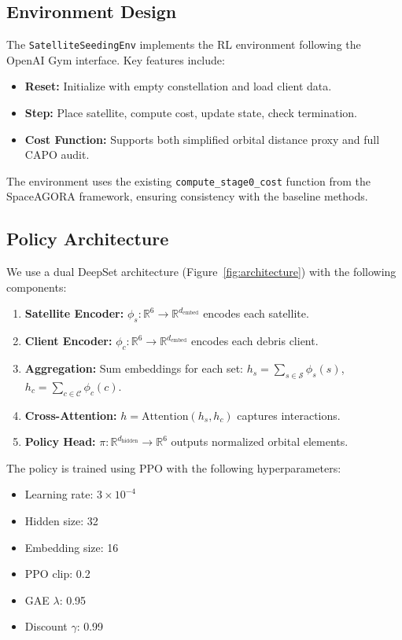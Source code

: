\subsection{Environment Design}

The \texttt{SatelliteSeedingEnv} implements the RL environment following the OpenAI Gym interface. Key features include:

\begin{itemize}
    \item \textbf{Reset:} Initialize with empty constellation and load client data.
    \item \textbf{Step:} Place satellite, compute cost, update state, check termination.
    \item \textbf{Cost Function:} Supports both simplified orbital distance proxy and full CAPO audit.
\end{itemize}

The environment uses the existing \texttt{compute\_stage0\_cost} function from the SpaceAGORA framework, ensuring consistency with the baseline methods.

\subsection{Policy Architecture}

We use a dual DeepSet architecture (Figure~\ref{fig:architecture}) with the following components:

\begin{enumerate}
    \item \textbf{Satellite Encoder:} $\phi_s: \mathbb{R}^6 \rightarrow \mathbb{R}^{d_{\text{embed}}}$ encodes each satellite.
    \item \textbf{Client Encoder:} $\phi_c: \mathbb{R}^6 \rightarrow \mathbb{R}^{d_{\text{embed}}}$ encodes each debris client.
    \item \textbf{Aggregation:} Sum embeddings for each set: $h_s = \sum_{s \in \mathcal{S}} \phi_s(s)$, $h_c = \sum_{c \in \mathcal{C}} \phi_c(c)$.
    \item \textbf{Cross-Attention:} $h = \text{Attention}(h_s, h_c)$ captures interactions.
    \item \textbf{Policy Head:} $\pi: \mathbb{R}^{d_{\text{hidden}}} \rightarrow \mathbb{R}^6$ outputs normalized orbital elements.
\end{enumerate}

The policy is trained using PPO with the following hyperparameters:
\begin{itemize}
    \item Learning rate: $3 \times 10^{-4}$
    \item Hidden size: 32
    \item Embedding size: 16
    \item PPO clip: 0.2
    \item GAE $\lambda$: 0.95
    \item Discount $\gamma$: 0.99
\end{itemize}


